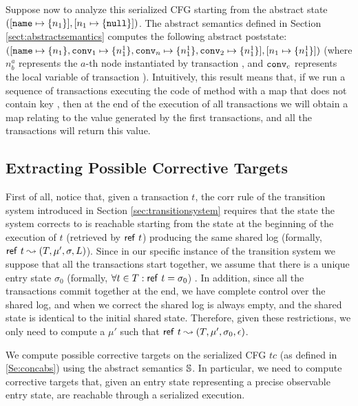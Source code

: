 Suppose now to analyze this serialized CFG starting from the abstract state $([\mathtt{name} \mapsto \{n_1\}], [n_1 \mapsto \{\mathtt{null}\}])$. The abstract semantics defined in Section \ref{sect:abstractsemantics} computes the following abstract poststate: $([\mathtt{name} \mapsto \{n_1\}, \mathtt{conv}_1 \mapsto \{n^1_1\}, \mathtt{conv}_n \mapsto \{n^1_1\}, \mathtt{conv}_2 \mapsto \{n^1_1\}], [n_1 \mapsto \{n^1_1\}])$ (where $n^a_b$ represents the $a$-th node instantiated by transaction , and $\mathtt{conv}_c$ represents the local variable  of transaction ). Intuitively, this result means that, if we run a sequence of transactions executing the code of method  with a map that does not contain key , then at the end of the execution of all transactions we will obtain a map relating  to the value generated by the first transactions, and all the transactions will return this value.

\subsection{Extracting Possible Corrective Targets}
First of all, notice that, given a transaction $t$, the {\sf corr} rule of the transition system introduced in Section \ref{sec:transitionsystem} requires that the state the system corrects to is reachable starting from the state at the beginning of the execution of $t$ (retrieved by ${\sf ref}\ t$) producing the same shared log (formally, ${\sf ref}\ t \leadsto (T,\mu', \sigma, L)$). Since in our specific instance of the transition system we suppose that all the transactions start together, we assume that there is a unique entry state $\sigma_0$ (formally, $\forall t \in T : {\sf ref}\ t=\sigma_0$) . In addition, since all the transactions commit together at the end, we have complete control over the shared log, and when we correct the shared log is always empty, and the shared state is identical to the initial shared state. Therefore, given these restrictions, we only need to compute a $\mu'$ such that ${\sf ref}\ t \leadsto (T,\mu', \sigma_0, \epsilon)$.

We compute possible corrective targets on the serialized CFG $tc$ (as defined in \ref{Se:concabs}) using the abstract semantics $\mathbb{S}$. In particular, we need to compute corrective targets that, given an entry state representing a precise observable entry state, are reachable through a serialized execution. 

